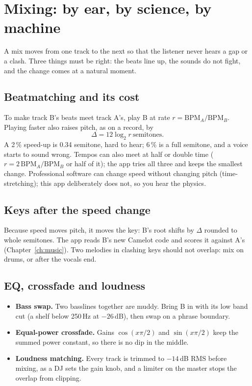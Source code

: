\chapter{Mixing: by ear, by science, by machine}\label{ch:mixing}

A mix moves from one track to the next so that the listener never hears a gap or a clash. Three things must be right: the beats line up, the sounds do not fight, and the change comes at a natural moment.

\section{Beatmatching and its cost}
To make track B's beats meet track A's, play B at rate $r = \text{BPM}_A/\text{BPM}_B$. Playing faster also raises pitch, as on a record, by
\[ \Delta = 12\log_2 r \ \text{semitones}. \]
A 2\,\% speed-up is 0.34 semitone, hard to hear; 6\,\% is a full semitone, and a voice starts to sound wrong. Tempos can also meet at half or double time ($r = 2\,\text{BPM}_A/\text{BPM}_B$ or half of it); the app tries all three and keeps the smallest change. Professional software can change speed without changing pitch (time-stretching); this app deliberately does not, so you hear the physics.

\section{Keys after the speed change}
Because speed moves pitch, it moves the key: B's root shifts by $\Delta$ rounded to whole semitones. The app reads B's new Camelot code and scores it against A's (Chapter~\ref{ch:music}). Two melodies in clashing keys should not overlap: mix on drums, or after the vocals end.

\section{EQ, crossfade and loudness}
\begin{itemize}
\item \textbf{Bass swap.} Two basslines together are muddy. Bring B in with its low band cut (a shelf below 250\,Hz at $-26$\,dB), then swap on a phrase boundary.
\item \textbf{Equal-power crossfade.} Gains $\cos(x\pi/2)$ and $\sin(x\pi/2)$ keep the summed power constant, so there is no dip in the middle.
\item \textbf{Loudness matching.} Every track is trimmed to $-14$\,dB RMS before mixing, as a DJ sets the gain knob, and a limiter on the master stops the overlap from clipping.
\end{itemize}

